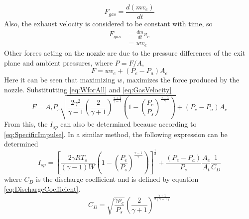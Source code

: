 \begin{equation}
F_{gas}=\frac{d(mv_e)}{dt}
\end{equation}
Also, the exhaust velocity is considered to be constant with time, so
\begin{align}
F_{gas}&=\frac{dm}{dt}v_e\\
&=wv_e
\end{align}
Other forces acting on the nozzle are due to the pressure differences of the exit plane and ambient pressures, where $P=F/A$,
\begin{equation}
F=wv_e + (P_e-P_a)A_e
\end{equation}
Here it can be seen that maximizing $w$, maximizes the force produced by the nozzle. Substitutting \ref{eq:WforAll} and \ref{eq:GasVelocity}
\begin{equation}\label{eq:TheoreticalForce}
F= A_tP_s\sqrt{\frac{2\gamma^2}{\gamma-1}\left(\frac{2}{\gamma+1}\right)^{\frac{\gamma+1}{\gamma-1}}\left(1-\left(\frac{P_e}{P_s}\right)^{\frac{\gamma-1}{\gamma}}\right)}+\left(P_e-P_a\right)A_e
\end{equation}
From this, the $I_{sp}$ can also be determined because according to \ref{eq:SpecificImpulse}. In a similar method, the following expression can be determined
\begin{equation}\label{eq:TheoreticalSpecificImpulse}
I_{sp}=\left[\frac{2\gamma R T_s}{(\gamma-1)W}\left(1-\left(\frac{P_e}{P_s}\right)^{\frac{\gamma-1}{\gamma}}\right)\right]^{\frac{1}{2}}+\frac{(P_e-P_a)}{P_s}\frac{A_e}{A_t}\frac{1}{C_D}
\end{equation}
where $C_D$ is the discharge coefficient and is defined by equation \ref{eq:DischargeCoefficient}.
\begin{equation}\label{eq:DischargeCoefficient}
C_D=\sqrt{\frac{\gamma \rho_c}{P_s}}\left(\frac{2}{\gamma+1}\right)^{\frac{\gamma+1}{2(\gamma-1)}}
\end{equation}%
